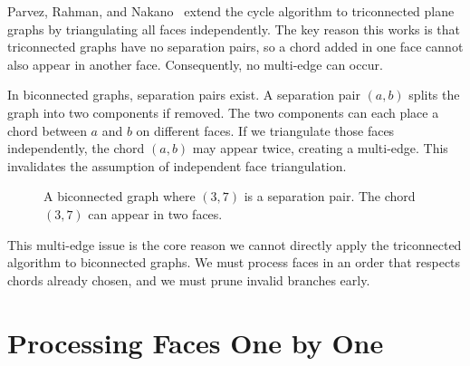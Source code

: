 \documentclass[12pt,a4paper]{report}
\theoremstyle{definition}
\theoremstyle{remark}
\begin{document}
Parvez, Rahman, and Nakano~\cite{parvez2011} extend the cycle algorithm to triconnected
plane graphs by triangulating all faces independently. The key reason this works is that
triconnected graphs have no separation pairs, so a chord added in one face cannot also
appear in another face. Consequently, no multi-edge can occur.

In biconnected graphs, separation pairs exist. A separation pair $(a,b)$ splits the graph
into two components if removed. The two components can each place a chord between $a$ and
$b$ on different faces. If we triangulate those faces independently, the chord $(a,b)$ may
appear twice, creating a multi-edge. This invalidates the assumption of independent face
triangulation.

\begin{figure}[h]
    \centering
    \caption{A biconnected graph where $(3,7)$ is a separation pair. The chord $(3,7)$ can appear in two faces.}
    \label{fig:separation_pair}
\end{figure}

This multi-edge issue is the core reason we cannot directly apply the triconnected
algorithm to biconnected graphs. We must process faces in an order that respects chords
already chosen, and we must prune invalid branches early.

\chapter{Processing Faces One by One}
\label{chap:faces}
\end{document}
